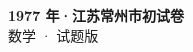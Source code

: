 \documentclass[zihao=-4, a4paper]{ctexart}
\begin{document}
\begin{center}
  {\Large\bfseries 1977 年·江苏常州市初试卷}\\[4pt]
  {\large 数学 · 试题版}
\end{center}
\medskip
{}

\end{document}

